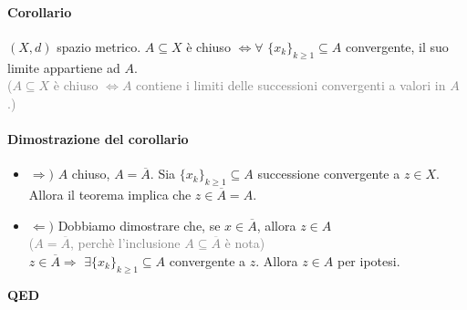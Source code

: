 \documentclass{article}
\begin{document}
\paragraph{{Corollario}}
$(X,d)$ spazio metrico. $A \subseteq X$ è chiuso $\Leftrightarrow \forall\,\, \{x_k\}_{k \geq 1} \subseteq A$ convergente, il suo limite appartiene ad $A$.\\
\textcolor{grey}{($A \subseteq X$ è chiuso $\Leftrightarrow A$ contiene i limiti delle successioni convergenti a valori in $A$.)}

\paragraph{{Dimostrazione del corollario}}
\begin{itemize}
    \item $\Rightarrow)$ $A$ chiuso, $A = \overline{A}$. Sia $\{x_k\}_{k \geq 1} \subseteq A$ successione convergente a $z \in X$. Allora il teorema implica che $z \in \overline{A}= A$.
    \item $\Leftarrow ) $ Dobbiamo dimostrare che, se $x \in \overline{A}$, allora $z \in A$\\ \textcolor{grey}{($A=\overline{A}$, perchè l'inclusione $A \subseteq \overline{A}$ è nota)}\\
$z \in \overline{A} \Rightarrow \,\, \exists \{x_k\}_{k \geq 1} \subseteq A$ convergente a $z$. Allora $z \in A$ per ipotesi.
\end{itemize}
\begin{flushright}
\textbf{QED}
\end{flushright}
\end{document}
